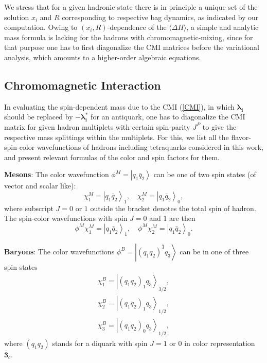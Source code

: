 \documentclass[12pt,prd,onecolumn,floatfix,nofootinbib]{revtex4}
\begin{document}
We stress that for a given hadronic state there is in principle a unique set
of the solution $x_{i}$ and $R$ corresponding to respective bag dynamics, as
indicated by our computation. Owing to $(x_{i},R)$-dependence of the $%
\langle \Delta H \rangle$, a simple and analytic mass formula is lacking for
the hadrons with chromomagnetic-mixing, since for that purpose one has to
first diagonalize the CMI matrices before the variational analysis, which
amounts to a higher-order algebraic equations.

\subsection{Chromomagnetic Interaction}

In evaluating the spin-dependent mass due to the CMI (\ref{CMI}), in which $%
\boldsymbol{\lambda _{i}}$ should be replaced by $-\boldsymbol{\lambda
_{i}^{\ast }}$ for an antiquark, one has to diagonalize the CMI matrix for
given hadron multiplets with certain spin-parity $J^{P}$ to give the
respective mass splittings \cite{Luo:2017eub} within the multiplets. For
this, we list all the flavor-spin-color wavefunctions of hadrons including
tetraquarks considered in this work, and present relevant formulas of the
color and spin factors for them.

\textbf{Mesons}: The color wavefunction $\phi ^{M}=\left\vert q_{1}\bar{q}%
_{2}\right\rangle $ can be one of two spin states (of vector and scalar
like):
\begin{equation}
\chi _{1}^{M}={\left\vert q_{1}\bar{q}_{2}\right\rangle }_{1},\quad \chi
_{2}^{M}={\left\vert q_{1}\bar{q}_{2}\right\rangle }_{0},  \label{spinM}
\end{equation}%
where subscript $J=0$ or $1$ outside the bracket denotes the total spin of
hadron. The spin-color wavefunctions with spin $J=0$ and $1$ are then
\begin{equation}
\phi ^{M}\chi _{1}^{M}={\left\vert q_{1}\bar{q}_{2}\right\rangle }_{1},\quad
\phi ^{M}\chi _{2}^{M}={\left\vert q_{1}\bar{q}_{2}\right\rangle }_{0}.
\label{colorspinM}
\end{equation}

\textbf{Baryons}: The color wavefunctions $\phi ^{B}=\left\vert {\left(
q_{1}q_{2}\right) }^{\bar{3}}q_{3}\right\rangle $ can be in one of three
spin states
\begin{equation}
\begin{aligned} \chi_{1}^{B}={\left| {\left(q_{1}q_{2}\right)}_{1} q_{3}
\right\rangle}_{3/2}, \\ \chi_{2}^{B}={\left| {\left(q_{1}q_{2}\right)}_{1}
q_{3} \right\rangle}_{1/2}, \\ \chi_{3}^{B}={\left|
{\left(q_{1}q_{2}\right)}_{0} q_{3} \right\rangle}_{1/2}, \end{aligned}
\label{spinB}
\end{equation}%
where $\left( q_{1}q_{2}\right) $ stands for a diquark with spin $J=1$ or $0$
in color representation $\boldsymbol{\bar{3}}_{c}$.
\end{document}
